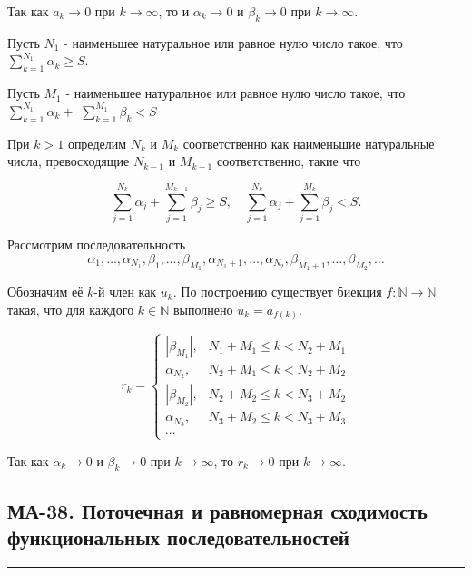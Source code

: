 \documentclass[a4paper,12pt]{article} %
\newcommand{\HRule}{\rule{\linewidth}{0.5mm}}
\begin{document}
	Так как $a_{k} \rightarrow 0$ при $k \rightarrow \infty$, то и $\alpha_{k} \rightarrow 0$ и $\beta_{k} \rightarrow 0$ при $k \rightarrow \infty$.
	
	Пусть $N_{1}$ - наименьшее натуральное или равное нулю число такое, что $\sum_{k=1}^{N_{1}} \alpha_{k} \geq S$.
	
	Пусть $M_{1}$ - наименьшее натуральное или равное нулю число такое, что $\sum_{k=1}^{N_{1}} \alpha_{k}+$ $\sum_{k=1}^{M_{1}} \beta_{k}<S$
	
	При $k>1$ определим $N_{k}$ и $M_{k}$ соответственно как наименьшие натуральные числа, превосходящие $N_{k-1}$ и $M_{k-1}$ соответственно, такие что
	
	$$
	\sum_{j=1}^{N_{k}} \alpha_{j}+\sum_{j=1}^{M_{k-1}} \beta_{j} \geq S, \quad \sum_{j=1}^{N_{k}} \alpha_{j}+\sum_{j=1}^{M_{k}} \beta_{j}<S .
	$$
	
	Рассмотрим последовательность
	$$
	\alpha_{1}, \ldots, \alpha_{N_{1}}, \beta_{1}, \ldots, \beta_{M_{1}}, \alpha_{N_{1}+1}, \ldots, \alpha_{N_{2}}, \beta_{M_{1}+1}, \ldots, \beta_{M_{2}}, \ldots
	$$
	
	Обозначим её $k$-й член как $u_{k}$. По построению существует биекция $f: \mathbb{N} \rightarrow \mathbb{N}$ такая, что для каждого $k \in \mathbb{N}$ выполнено $u_{k}=a_{f(k)}$.
	
	$$
	r_{k}= \begin{cases}\left|\beta_{M_{1}}\right|, & N_{1}+M_{1} \leq k<N_{2}+M_{1} \\ \alpha_{N_{2}}, & N_{2}+M_{1} \leq k<N_{2}+M_{2} \\ \left|\beta_{M_{2}}\right|, & N_{2}+M_{2} \leq k<N_{3}+M_{2} \\ \alpha_{N_{3}}, & N_{3}+M_{2} \leq k<N_{3}+M_{3} \\ \cdots & \end{cases}
	$$
	
	Так как $\alpha_{k} \rightarrow 0$ и $\beta_{k} \rightarrow 0$ при $k \rightarrow \infty$, то $r_{k} \rightarrow 0$ при $k \rightarrow \infty$.
	


	\newpage

	\begin{LARGE}
		\begin{center}
			\section{МА-38. Поточечная и равномерная сходимость функциональных последовательностей }
		\end{center}
	\end{LARGE}
	\HRule \\
\end{document}
